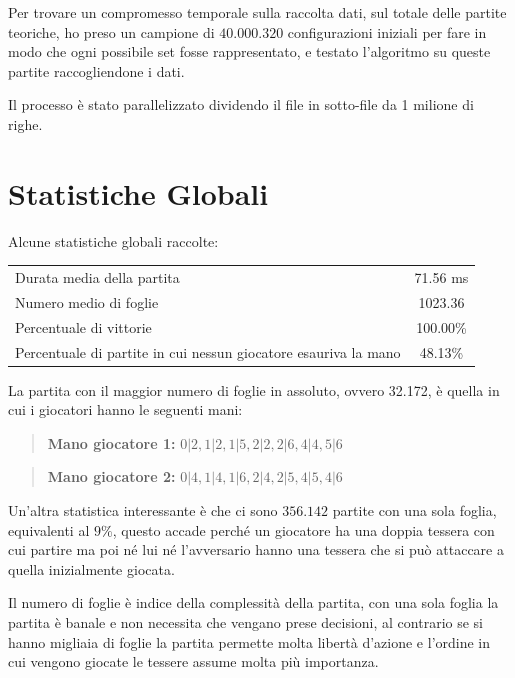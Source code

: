 \documentclass[a4paper,12pt]{report}
\begin{document}
Per trovare un compromesso temporale sulla raccolta dati, sul totale delle partite teoriche, ho preso un campione di \(40.000.320\) configurazioni iniziali per fare in modo che ogni possibile set fosse rappresentato, e testato l'algoritmo su queste partite raccogliendone i dati.

Il processo è stato parallelizzato dividendo il file in sotto-file da 1 milione di righe.



\section{Statistiche Globali}

Alcune statistiche globali raccolte:

\begin{table}[h!]
    \centering
    \begin{tabular}{|l|c|}
        \hline
        Durata media della partita & 71.56 ms \\
        Numero medio di foglie & 1023.36 \\
        Percentuale di vittorie & 100.00\% \\
        Percentuale di partite in cui nessun giocatore esauriva la mano & 48.13\% \\
        \hline
    \end{tabular}
    \label{tab:global_stats}
\end{table}

La partita con il maggior numero di foglie in assoluto, ovvero 32.172, è quella in cui i giocatori hanno le seguenti mani:

\begin{quote}
    \textbf{Mano giocatore 1:} \(0|2, 1|2, 1|5, 2|2, 2|6, 4|4, 5|6\)
\end{quote}

\begin{quote}
    \textbf{Mano giocatore 2:} \(0|4, 1|4, 1|6, 2|4, 2|5, 4|5, 4|6\) 
\end{quote}



Un'altra statistica interessante è che ci sono \( 356.142 \) partite con una sola foglia, equivalenti al \( 9\%\), questo accade perché un giocatore ha una doppia tessera con cui partire ma poi né lui né l'avversario hanno una tessera che si può attaccare a quella inizialmente giocata.


Il numero di foglie è indice della complessità della partita, con una sola foglia la partita è banale e non necessita che vengano prese decisioni, al contrario se si hanno migliaia di foglie la partita permette molta libertà d'azione e l'ordine in cui vengono giocate le tessere assume molta più importanza.
\end{document}
